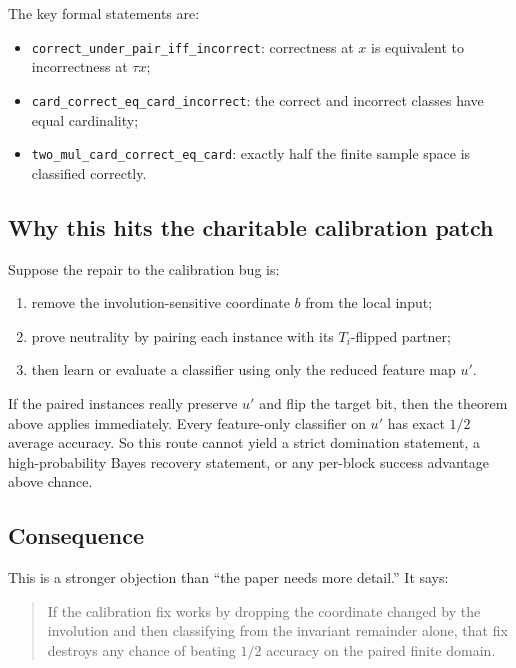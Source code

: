 \documentclass[11pt]{article}
\theoremstyle{remark}
\begin{document}
\noindent
The key formal statements are:
\begin{itemize}[leftmargin=1.5em]
  \item \texttt{correct\_under\_pair\_iff\_incorrect}: correctness at \(x\) is equivalent to
  incorrectness at \(\tau x\);
  \item \texttt{card\_correct\_eq\_card\_incorrect}: the correct and incorrect classes have equal
  cardinality;
  \item \texttt{two\_mul\_card\_correct\_eq\_card}: exactly half the finite sample space is
  classified correctly.
\end{itemize}

\subsection{Why this hits the charitable calibration patch}

Suppose the repair to the calibration bug is:
\begin{enumerate}[leftmargin=1.5em]
  \item remove the involution-sensitive coordinate \(b\) from the local input;
  \item prove neutrality by pairing each instance with its \(T_i\)-flipped partner;
  \item then learn or evaluate a classifier using only the reduced feature map \(u'\).
\end{enumerate}

If the paired instances really preserve \(u'\) and flip the target bit, then the theorem above
applies immediately.  Every feature-only classifier on \(u'\) has exact \(1/2\) average accuracy.
So this route cannot yield a strict domination statement, a high-probability Bayes recovery
statement, or any per-block success advantage above chance.

\subsection{Consequence}

This is a stronger objection than ``the paper needs more detail.''  It says:

\begin{quote}
If the calibration fix works by dropping the coordinate changed by the involution and then
classifying from the invariant remainder alone, that fix destroys any chance of beating
\(1/2\) accuracy on the paired finite domain.
\end{quote}
\end{document}
